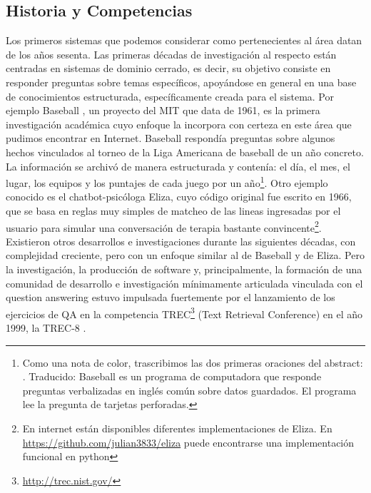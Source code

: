 \subsection{Historia y Competencias}
\label{subsec:historia}
\label{subsec:competencias}
Los primeros sistemas que podemos considerar como pertenecientes al área datan de los años sesenta. Las primeras décadas de investigación al respecto están centradas en sistemas de dominio cerrado, es decir, su objetivo consiste en responder preguntas sobre temas específicos, apoyándose en general en una base de conocimientos estructurada, específicamente creada para el sistema. Por ejemplo Baseball \cite{BASEBALL}, un proyecto del MIT que data de 1961, es la primera investigación académica cuyo enfoque la incorpora con certeza en este área que pudimos encontrar en Internet. Baseball respondía preguntas sobre algunos hechos vinculados al torneo de la Liga Americana de baseball de un año concreto. La información se archivó de manera estructurada y contenía: el día, el mes, el lugar, los equipos y los puntajes de cada juego por un año\footnote{Como una nota de color, trascribimos las dos primeras oraciones del abstract: . Traducido: Baseball es un programa de computadora que responde preguntas verbalizadas en inglés común sobre datos guardados. El programa lee la pregunta de tarjetas perforadas.}. Otro ejemplo conocido es el chatbot-psicóloga Eliza, cuyo código original fue escrito en 1966, que se basa en reglas muy simples de matcheo de las lineas ingresadas por el usuario para simular una conversación de terapia bastante convincente\footnote{En internet están disponibles diferentes implementaciones de Eliza. En \url{https://github.com/julian3833/eliza} puede encontrarse una implementación funcional en python}. Existieron otros desarrollos e investigaciones durante las siguientes décadas, con complejidad creciente, pero con un enfoque similar al de Baseball y de Eliza. Pero la investigación, la producción de software y, principalmente, la formación de una comunidad de desarrollo e investigación mínimamente articulada vinculada con el question answering estuvo impulsada fuertemente por el lanzamiento de los ejercicios de QA en la competencia TREC\footnote{\url{http://trec.nist.gov/}} (Text Retrieval Conference) en el año 1999, la TREC-8 \cite{TREC8}.

